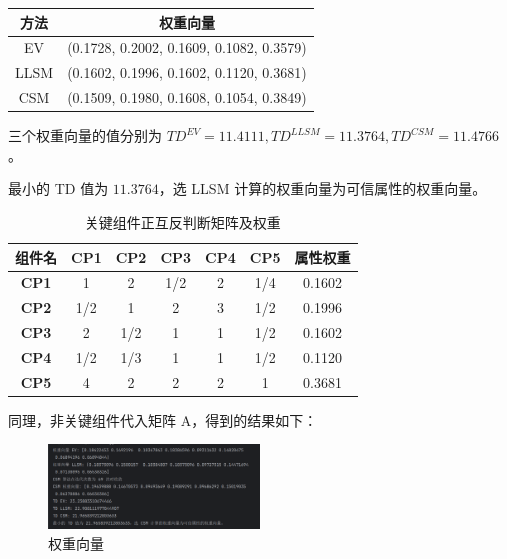 \documentclass[14pt,a4paper,UTF8,twoside]{article}
\begin{document}
  \begin{table}[H]
    \centering
    \begin{tabular}{c|c}
    \hline
    方法 & 权重向量 \\ 
    \hline
    EV   & (0.1728, 0.2002, 0.1609, 0.1082, 0.3579) \\ 
    LLSM & (0.1602, 0.1996, 0.1602, 0.1120, 0.3681) \\ 
    CSM  & (0.1509, 0.1980, 0.1608, 0.1054, 0.3849) \\ 
    \hline
    \end{tabular}
  \end{table}
  
\begin{center}
  三个权重向量的值分别为 $ TD^{EV} = 11.4111, TD^{LLSM} = 11.3764, TD^{CSM} = 11.4766 $。
  
  最小的 TD 值为 $ 11.3764 $，选 LLSM 计算的权重向量为可信属性的权重向量。
\end{center}

\begin{table}[H]
    \centering
    \caption{关键组件正互反判断矩阵及权重}
    \label{tab:critical_weights}
    \begin{tabular}{|c|c|c|c|c|c|c|}
    \hline
    \textbf{组件名} & \textbf{CP1} & \textbf{CP2} & \textbf{CP3} & \textbf{CP4} & \textbf{CP5} & \textbf{属性权重} \\ \hline
    \textbf{CP1}   & 1            & 2            & 1/2          & 2            & 1/4          & 0.1602           \\ \hline
    \textbf{CP2}   & 1/2          & 1            & 2            & 3            & 1/2          & 0.1996           \\ \hline
    \textbf{CP3}   & 2            & 1/2          & 1            & 1            & 1/2          & 0.1602           \\ \hline
    \textbf{CP4}   & 1/2          & 1/3          & 1            & 1            & 1/2          & 0.1120           \\ \hline
    \textbf{CP5}   & 4            & 2            & 2            & 2            & 1            & 0.3681           \\ \hline
    \end{tabular}
\end{table}

同理，非关键组件代入矩阵 A，得到的结果如下：

\begin{figure} [H]
    \centering
    \includegraphics[width = 0.5\textwidth]{img9/weights2.png}
    \caption{权重向量}
    \label{fig:first}
\end{figure}
\end{document}
